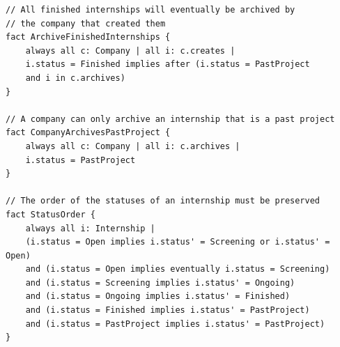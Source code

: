 \documentclass[11pt,twoside]{article}
\begin{document}
{\begin{verbatim}
// All finished internships will eventually be archived by
// the company that created them
fact ArchiveFinishedInternships {
    always all c: Company | all i: c.creates |
    i.status = Finished implies after (i.status = PastProject 
    and i in c.archives)
}

// A company can only archive an internship that is a past project
fact CompanyArchivesPastProject {
    always all c: Company | all i: c.archives |
    i.status = PastProject
}

// The order of the statuses of an internship must be preserved
fact StatusOrder {
    always all i: Internship |
    (i.status = Open implies i.status' = Screening or i.status' = Open)
    and (i.status = Open implies eventually i.status = Screening)
    and (i.status = Screening implies i.status' = Ongoing)
    and (i.status = Ongoing implies i.status' = Finished)
    and (i.status = Finished implies i.status' = PastProject)
    and (i.status = PastProject implies i.status' = PastProject)
}
\end{verbatim}
}
\end{document}
